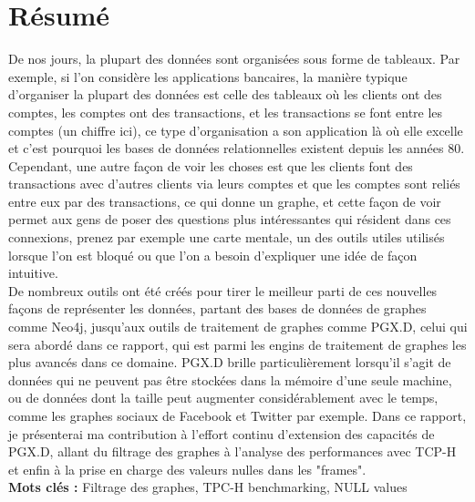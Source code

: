 

\chapter*{Résumé}
De nos jours, la plupart des données sont organisées sous forme de tableaux. Par exemple, si l'on considère les applications bancaires, la manière typique d'organiser la plupart des données est celle des tableaux où les clients ont des comptes, les comptes ont des transactions, et les transactions se font entre les comptes (un chiffre ici), ce type d'organisation a son application là où elle excelle et c'est pourquoi les bases de données relationnelles existent depuis les années 80. Cependant, une autre façon de voir les choses est que les clients font des transactions avec d'autres clients via leurs comptes et que les comptes sont reliés entre eux par des transactions, ce qui donne un graphe, et cette façon de voir permet aux gens de poser des questions plus intéressantes qui résident dans ces connexions, prenez par exemple une carte mentale, un des outils utiles utilisés lorsque l'on est bloqué ou que l'on a besoin d'expliquer une idée de façon intuitive. 
\\
De nombreux outils ont été créés pour tirer le meilleur parti de ces nouvelles façons de représenter les données, partant des bases de données de graphes comme Neo4j, jusqu'aux outils de traitement de graphes comme PGX.D, celui qui sera abordé dans ce rapport, qui est parmi les engins de traitement de graphes les plus avancés dans ce domaine. PGX.D brille particulièrement lorsqu'il s'agit de données qui ne peuvent pas être stockées dans la mémoire d'une seule machine, ou de données dont la taille peut augmenter considérablement avec le temps, comme les graphes sociaux de Facebook et Twitter par exemple. Dans ce rapport, je présenterai ma contribution à l'effort continu d'extension des capacités de PGX.D, allant du filtrage des graphes à l'analyse des performances avec TCP-H et enfin à la prise en charge des valeurs nulles dans les "frames".
\\

\noindent\textbf{Mots clés :} Filtrage des graphes, TPC-H benchmarking, NULL values

\newpage
